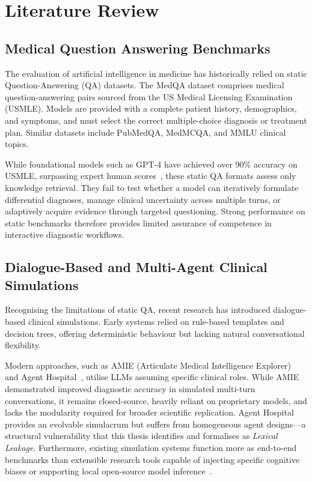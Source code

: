 \chapter{Literature Review}
\label{Chapter2}

\section{Medical Question Answering Benchmarks}

The evaluation of artificial intelligence in medicine has historically relied on static Question-Answering (QA) datasets. The MedQA dataset comprises medical question-answering pairs sourced from the US Medical Licensing Examination (USMLE). Models are provided with a complete patient history, demographics, and symptoms, and must select the correct multiple-choice diagnosis or treatment plan. Similar datasets include PubMedQA, MedMCQA, and MMLU clinical topics.

While foundational models such as GPT-4 have achieved over 90\% accuracy on USMLE, surpassing expert human scores~\cite{schmidgall2024agentclinic}, these static QA formats assess only knowledge retrieval. They fail to test whether a model can iteratively formulate differential diagnoses, manage clinical uncertainty across multiple turns, or adaptively acquire evidence through targeted questioning. Strong performance on static benchmarks therefore provides limited assurance of competence in interactive diagnostic workflows.

\section{Dialogue-Based and Multi-Agent Clinical Simulations}

Recognising the limitations of static QA, recent research has introduced dialogue-based clinical simulations. Early systems relied on rule-based templates and decision trees, offering deterministic behaviour but lacking natural conversational flexibility.

Modern approaches, such as AMIE (Articulate Medical Intelligence Explorer)~\cite{tu2024towards} and Agent Hospital~\cite{li2024agenthospital}, utilise LLMs assuming specific clinical roles. While AMIE demonstrated improved diagnostic accuracy in simulated multi-turn conversations, it remains closed-source, heavily reliant on proprietary models, and lacks the modularity required for broader scientific replication. Agent Hospital provides an evolvable simulacrum but suffers from homogeneous agent designs---a structural vulnerability that this thesis identifies and formalises as \textit{Lexical Leakage}. Furthermore, existing simulation systems function more as end-to-end benchmarks than extensible research tools capable of injecting specific cognitive biases or supporting local open-source model inference~\cite{fan2024aihospital,liao2024automatic}.

